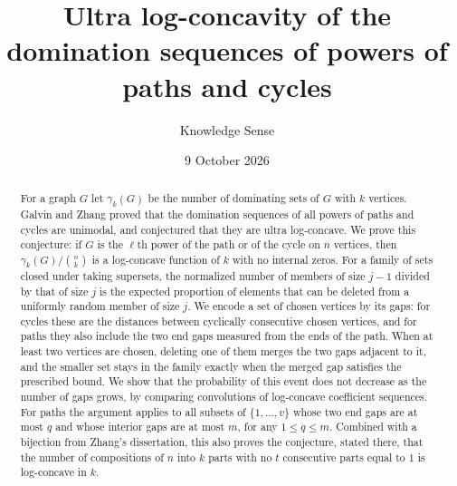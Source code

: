 \documentclass{amsart}
\theoremstyle{definition}
\theoremstyle{remark}
\numberwithin{equation}{section}
\begin{document}
\title[Ultra log-concavity of domination sequences]{Ultra log-concavity of the domination sequences of powers of paths and cycles}

\author{Knowledge Sense}
\address{Knowledge Sense}

\date{9 October 2026}



\begin{abstract}
For a graph $G$ let $\gamma_k(G)$ be the number of dominating sets of $G$ with $k$ vertices. Galvin and Zhang proved that the domination sequences of all powers of paths and cycles are unimodal, and conjectured that they are ultra log-concave. We prove this conjecture: if $G$ is the $\ell$th power of the path or of the cycle on $n$ vertices, then $\gamma_k(G)/\binom nk$ is a log-concave function of $k$ with no internal zeros. For a family of sets closed under taking supersets, the normalized number of members of size $j-1$ divided by that of size $j$ is the expected proportion of elements that can be deleted from a uniformly random member of size $j$. We encode a set of chosen vertices by its gaps: for cycles these are the distances between cyclically consecutive chosen vertices, and for paths they also include the two end gaps measured from the ends of the path. When at least two vertices are chosen, deleting one of them merges the two gaps adjacent to it, and the smaller set stays in the family exactly when the merged gap satisfies the prescribed bound. We show that the probability of this event does not decrease as the number of gaps grows, by comparing convolutions of log-concave coefficient sequences. For paths the argument applies to all subsets of $\{1,\dots,v\}$ whose two end gaps are at most $q$ and whose interior gaps are at most $m$, for any $1\le q\le m$. Combined with a bijection from Zhang's dissertation, this also proves the conjecture, stated there, that the number of compositions of $n$ into $k$ parts with no $t$ consecutive parts equal to $1$ is log-concave in $k$.
\end{abstract}

\maketitle
\end{document}
